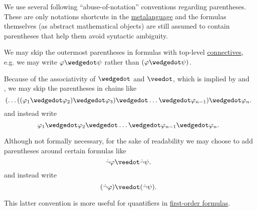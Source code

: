 \begin{remark}\label{rem:propositional_formula_parentheses}
  We use several following \enquote{abuse-of-notation} conventions regarding parentheses. These are only notations shortcuts in the \hyperref[con:metalogic]{metalanguage} and the formulas themselves (as abstract mathematical objects) are still assumed to contain parentheses that help them avoid syntactic ambiguity.

  \begin{thmenum}
     We may skip the outermost parentheses in formulas with top-level \hyperref[def:propositional_alphabet/connectives]{connectives}, e.g. we may write \( \varphi \synwedge \psi \) rather than \( (\varphi \synwedge \psi) \).

     Because of the associativity of \( \synwedge \) and \( \synvee \), which is implied by  and , we may skip the parentheses in chains like
    \begin{equation*}
      ( \ldots ((\varphi_1 \synwedge \varphi_2) \synwedge \varphi_3) \synwedge \ldots \synwedge \varphi_{n-1} ) \synwedge \varphi_n.
    \end{equation*}
    and instead write
    \begin{equation*}
      \varphi_1 \synwedge \varphi_2 \synwedge \ldots \synwedge \varphi_{n-1} \synwedge \varphi_n.
    \end{equation*}

     Although not formally necessary, for the sake of readability we may choose to add parentheses around certain formulas like
    \begin{equation*}
      \synneg \varphi \synvee \synneg \psi.
    \end{equation*}
    and instead write
    \begin{equation*}
      (\synneg \varphi) \synvee (\synneg \psi).
    \end{equation*}

    This latter convention is more useful for quantifiers in \hyperref[def:first_order_syntax/formula]{first-order formulas}.
  \end{thmenum}
\end{remark}

